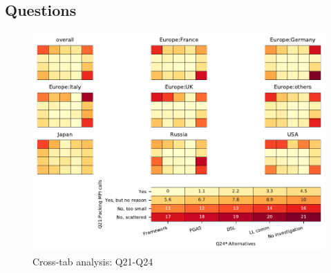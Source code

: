 
\subsection{Questions}


\begin{figure}
\begin{center}
\includegraphics[width=12cm]{../pdfs/Q21-Q24.pdf}
\caption{Cross-tab analysis: Q21-Q24}
\label{fig:Q21-Q24}
\end{center}
\end{figure}
